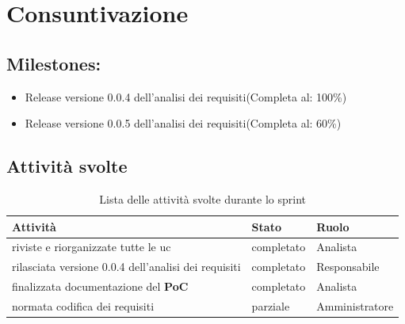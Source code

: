 \section{Consuntivazione}

\subsection{Milestones:}
\begin{itemize}
    \item Release versione 0.0.4 dell'analisi dei requisiti(Completa al: 100\%)
    \item Release versione 0.0.5 dell'analisi dei requisiti(Completa al: 60\%)
\end{itemize}

\subsection{Attività svolte}

\begin{table}[H]
    \begin{xltabular}{\textwidth}{X l l}
        
         \textbf{Attività} & \textbf{Stato} & \textbf{Ruolo}\\
        \endhead
        \hline
        riviste e riorganizzate tutte le uc & completato & Analista \\
        rilasciata versione 0.0.4 dell'analisi dei requisiti & completato & Responsabile \\
        finalizzata documentazione del \textbf{PoC} & completato & Analista \\
        normata codifica dei requisiti & parziale & Amministratore \\
    \end{xltabular}
    \caption{Lista delle attività svolte durante lo sprint}
\end{table}


